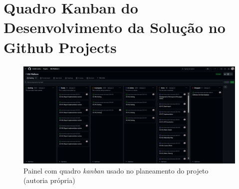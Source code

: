 \chapter{Quadro Kanban do Desenvolvimento da Solução no Github Projects}
\label{AppendixD}

\begin{figure}[h]
    \centering
    \includegraphics[width=5in]{frontmatter/assets/github_projects.png}
    \caption{Painel com quadro \textit{kanban} usado no planeamento do projeto (autoria própria)}
    \label{fig:mapeamento}
\end{figure}